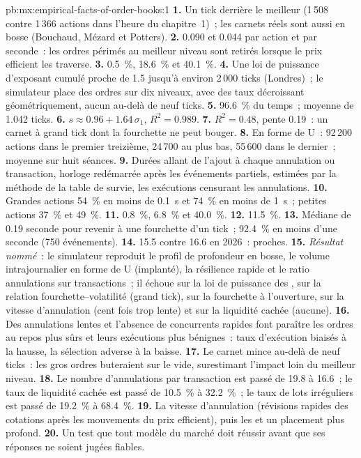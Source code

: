 \begin{solution}{pb:mx:empirical-facts-of-order-books:1}
\textbf{1.} Un tick derrière le meilleur (1\,508 contre 1\,366 actions dans l'heure du chapitre~1)~; les carnets réels sont aussi en bosse (Bouchaud, Mézard et Potters).
\textbf{2.} 0.090 et 0.044 par action et par seconde~: les ordres périmés au meilleur niveau sont retirés lorsque le prix efficient les traverse.
\textbf{3.} 0.5~\%, 18.6~\% et 40.1~\%.
\textbf{4.} Une loi de puissance d'exposant cumulé proche de 1.5 jusqu'à environ 2\,000 ticks (Londres)~; le simulateur place des ordres sur dix niveaux, avec des taux
décroissant géométriquement, aucun au-delà de neuf ticks.
\textbf{5.} 96.6~\% du temps~; moyenne de 1.042 ticks.
\textbf{6.} $s\approx0.96+1.64\,\sigma_1$, $R^2=0.989$.
\textbf{7.} $R^2=0.48$, pente 0.19~: un carnet à grand tick dont la fourchette ne peut bouger.
\textbf{8.} En forme de U~: 92\,200 actions dans le premier treizième, 24\,700 au plus bas, 55\,600 dans le dernier~; moyenne sur huit séances.
\textbf{9.} Durées allant de l'ajout à chaque annulation ou transaction, horloge redémarrée après les événements partiels, estimées par la méthode de la table de survie, les exécutions censurant
les annulations.
\textbf{10.} Grandes actions 54~\% en moins de 0.1~s et 74~\% en moins de 1~s~; petites actions 37~\% et 49~\%.
\textbf{11.} 0.8~\%, 6.8~\% et 40.0~\%.
\textbf{12.} 11.5~\%.
\textbf{13.} Médiane de 0.19 seconde pour revenir à une fourchette d'un tick~; 92.4~\% en moins d'une seconde (750 événements).
\textbf{14.} 15.5 contre 16.6 en 2026~: proches.
\textbf{15.} \emph{Résultat nommé}~: le simulateur reproduit le profil de profondeur en bosse, le volume intrajournalier en forme de U (implanté), la résilience rapide et le
ratio annulations sur transactions~; il échoue sur la loi de puissance des , sur la relation fourchette--volatilité (grand tick), sur la fourchette à l'ouverture, sur la vitesse d'annulation
(cent fois trop lente) et sur la liquidité cachée (aucune).
\textbf{16.} Des annulations lentes et l'absence de concurrents rapides font paraître les ordres au repos plus sûrs et leurs exécutions plus bénignes~: taux d'exécution biaisés à la hausse, la
sélection adverse à la baisse.
\textbf{17.} Le carnet mince au-delà de neuf ticks~: les gros ordres buteraient sur le vide, surestimant l'impact loin du meilleur niveau.
\textbf{18.} Le nombre d'annulations par transaction est passé de 19.8 à 16.6~; le taux de liquidité cachée est passé de 10.5~\% à 32.2~\%~; le taux de lots irréguliers est passé de 19.2~\% à 68.4~\%.
\textbf{19.} La vitesse d'annulation (révisions rapides des cotations après les mouvements du prix efficient), puis les  et un placement plus profond.
\textbf{20.} Un test que tout modèle du marché doit réussir avant que ses réponses ne soient jugées fiables.
\end{solution}

